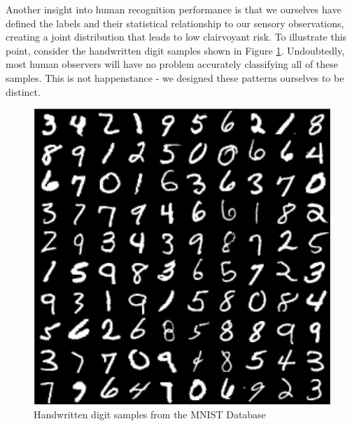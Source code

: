 \documentclass[12pt]{article}
\begin{document}
Another insight into human recognition performance is that we ourselves have defined the labels and their statistical relationship to our sensory observations, creating a joint distribution that leads to low clairvoyant risk. To illustrate this point, consider the handwritten digit samples \cite{lecun-mnist} shown in Figure \ref{fig:mnist_digit_ex}. Undoubtedly, most human observers will have no problem accurately classifying all of these samples. This is not happenstance - we designed these patterns ourselves to be distinct.
\begin{figure}
\centering
\includegraphics[width=0.5\linewidth]{mnist_digit_ex.png}
\caption{Handwritten digit samples from the MNIST Database}
\label{fig:mnist_digit_ex}
\end{figure}
\end{document}
